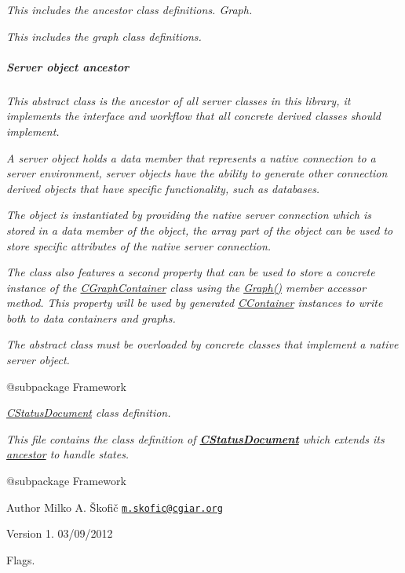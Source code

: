 {\itshape This includes the ancestor class definitions. Graph.}

{\itshape This includes the graph class definitions. \subparagraph*{Server object ancestor}}

{\itshape }

{\itshape This {\itshape abstract} class is the ancestor of all server classes in this library, it implements the interface and workflow that all concrete derived classes should implement.}

{\itshape A server object holds a data member that represents a native connection to a server environment, server objects have the ability to generate other connection derived objects that have specific functionality, such as databases.}

{\itshape The object is instantiated by providing the native server connection which is stored in a data member of the object, the array part of the object can be used to store specific attributes of the native server connection.}

{\itshape The class also features a second property that can be used to store a concrete instance of the \hyperlink{class_c_graph_container}{C\-Graph\-Container} class using the \hyperlink{}{Graph()} member accessor method. This property will be used by generated \hyperlink{class_c_container}{C\-Container} instances to write both to data containers and graphs.}

{\itshape The abstract class must be overloaded by concrete classes that implement a native server object.}

{\itshape \begin{DoxyVerb} @subpackage        Framework\end{DoxyVerb}
}

{\itshape {\itshape \hyperlink{class_c_status_document}{C\-Status\-Document}} class definition.}

{\itshape This file contains the class definition of {\bfseries \hyperlink{class_c_status_document}{C\-Status\-Document}} which extends its \hyperlink{class_c_document}{ancestor} to handle states.}

{\itshape \begin{DoxyVerb} @subpackage        Framework
\end{DoxyVerb}
}

{\itshape \begin{DoxyAuthor}{Author}
Milko A. Škofič \href{mailto:m.skofic@cgiar.org}{\tt m.\-skofic@cgiar.\-org} 
\end{DoxyAuthor}
\begin{DoxyVersion}{Version}
1. 03/09/2012
\end{DoxyVersion}
Flags.}

